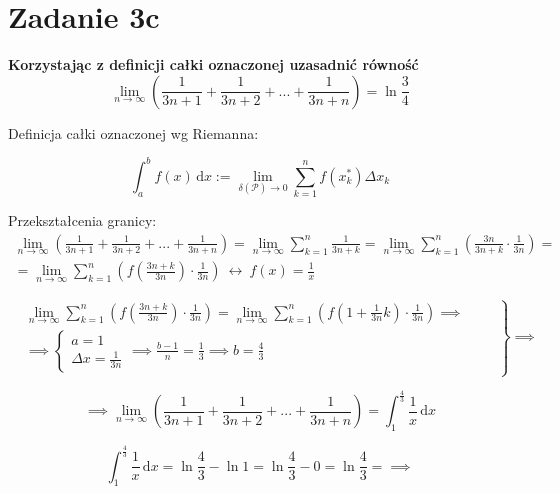 \documentclass[12pt]{article}
\newcommand{\for}{\ \leftrightarrow\ }
\newcommand{\Integral}[4]{\int_{#1}^{#2} \! #3 \, \mathrm{d}#4}
\newcommand{\task}[1]{\textbf{ #1}}
\DeclareMathOperator{\?}{?}
\begin{document}
\section{Zadanie 3c}
\task{Korzystając z definicji całki oznaczonej uzasadnić równość }
\[ \lim_{n \to \infty} \left( \frac{1}{3n+1} + \frac{1}{3n+2} + ... + \frac{1}{3n + n} \right) = \ln{\frac{3}{4}} \]

Definicja całki oznaczonej wg Riemanna:

\[ \Integral{a}{b}{f(x)}{x} := \lim_{\delta(\mathcal{P}) \to 0} \sum_{k=1}^n f(x_k^*) \Delta x_k\]

Przekształcenia granicy:
\begin{gather*}
    \lim_{n \to \infty} \left( \frac{1}{3n+1} + \frac{1}{3n+2} + ... + \frac{1}{3n + n} \right) =
    \lim_{n \to \infty} \sum_{k = 1}^n \frac{1}{3n + k} =
    \lim_{n \to \infty} \sum_{k = 1}^n \left( \frac{3n}{3n + k} \cdot \frac{1}{3n} \right) =\\
    = \lim_{n \to \infty} \sum_{k = 1}^n \left( f(\frac{3n + k}{3n}) \cdot \frac{1}{3n} \right)
    \for f(x) = \frac{1}{x}
\end{gather*}

\begin{equation*}
    \left.
    \begin{aligned}
        & \lim_{n \to \infty} \sum_{k = 1}^n \left( f(\frac{3n + k}{3n}) \cdot \frac{1}{3n} \right) =
        \lim_{n \to \infty} \sum_{k = 1}^n \left( f(1 + \frac{1}{3n}k) \cdot \frac{1}{3n} \right)
        \implies \qquad \\ & \implies
        \left\{ \begin{array}{l}
            a = 1 \\
            \Delta x = \frac{1}{3n}
        \end{array} \right.
        \implies \frac{b - 1}{n} = \frac{1}{3} \implies b = \frac{4}{3}
    \end{aligned}
    \right\}
    \implies
\end{equation*}

\begin{equation*}
    \implies
    \lim_{n \to \infty} \left( \frac{1}{3n+1} + \frac{1}{3n+2} + ... + \frac{1}{3n + n} \right) =
    \Integral{1}{\frac{4}{3}}{\frac{1}{x}}{x}
\end{equation*}

\begin{equation*}
    \Integral{1}{\frac{4}{3}}{\frac{1}{x}}{x} =
    \ln{\frac{4}{3}} - \ln{1} =
    \ln{\frac{4}{3}} - 0 =
    \ln{\frac{4}{3}} = \implies
\end{equation*}
\end{document}
